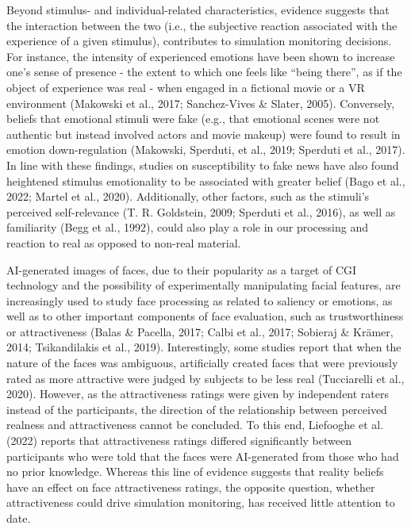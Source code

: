 \documentclass[
  man,floatsintext]{apa6}
\begin{document}
Beyond stimulus- and individual-related characteristics, evidence suggests that the interaction between the two (i.e., the subjective reaction associated with the experience of a given stimulus), contributes to simulation monitoring decisions. For instance, the intensity of experienced emotions have been shown to increase one's sense of presence - the extent to which one feels like ``being there'', as if the object of experience was real - when engaged in a fictional movie or a VR environment (Makowski et al., 2017; Sanchez-Vives \& Slater, 2005). Conversely, beliefs that emotional stimuli were fake (e.g., that emotional scenes were not authentic but instead involved actors and movie makeup) were found to result in emotion down-regulation (Makowski, Sperduti, et al., 2019; Sperduti et al., 2017). In line with these findings, studies on susceptibility to fake news have also found heightened stimulus emotionality to be associated with greater belief (Bago et al., 2022; Martel et al., 2020). Additionally, other factors, such as the stimuli's perceived self-relevance (T. R. Goldstein, 2009; Sperduti et al., 2016), as well as familiarity (Begg et al., 1992), could also play a role in our processing and reaction to real as opposed to non-real material.

AI-generated images of faces, due to their popularity as a target of CGI technology and the possibility of experimentally manipulating facial features, are increasingly used to study face processing as related to saliency or emotions, as well as to other important components of face evaluation, such as trustworthiness or attractiveness (Balas \& Pacella, 2017; Calbi et al., 2017; Sobieraj \& Krämer, 2014; Tsikandilakis et al., 2019). Interestingly, some studies report that when the nature of the faces was ambiguous, artificially created faces that were previously rated as more attractive were judged by subjects to be less real (Tucciarelli et al., 2020). However, as the attractiveness ratings were given by independent raters instead of the participants, the direction of the relationship between perceived realness and attractiveness cannot be concluded. To this end, Liefooghe et al. (2022) reports that attractiveness ratings differed significantly between participants who were told that the faces were AI-generated from those who had no prior knowledge. Whereas this line of evidence suggests that reality beliefs have an effect on face attractiveness ratings, the opposite question, whether attractiveness could drive simulation monitoring, has received little attention to date.
\end{document}

